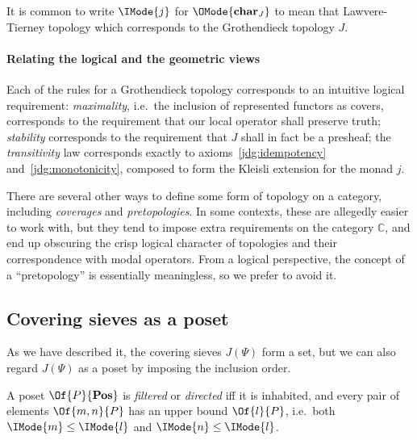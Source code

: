 \documentclass{article}
\newcommand\Char[1]{\mathbf{char}_{#1}}
\newcommand\Posets{\mathbf{Pos}}
\begin{document}
\begin{notation}
  It is common to write $\IMode{j}$ for $\OMode{\Char{J}}$ to mean
  that Lawvere-Tierney topology which corresponds to the Grothendieck
  topology $J$.
\end{notation}

\paragraph{Relating the logical and the geometric views}

Each of the rules for a Grothendieck topology corresponds to an
intuitive logical requirement: \emph{maximality}, i.e.\ the inclusion
of represented functors as covers, corresponds to the requirement that
our local operator shall preserve truth; \emph{stability} corresponds
to the requirement that $J$ shall in fact be a presheaf; the
\emph{transitivity} law corresponds exactly to
axioms~\ref{jdg:idempotency} and~\ref{jdg:monotonicity}, composed to
form the Kleisli extension for the monad $j$.

\begin{remark}
  There are several other ways to define some form of topology on a
  category, including \emph{coverages} and \emph{pretopologies}. In
  some contexts, these are allegedly easier to work with, but they
  tend to impose extra requirements on the category $\mathbb{C}$, and
  end up obscuring the crisp logical character of topologies and their
  correspondence with modal operators. From a logical perspective, the
  concept of a ``pretopology'' is essentially meaningless, so we
  prefer to avoid it.
\end{remark}

\subsection{Covering sieves as a poset}
\newcommand\IsLEQ[2]{\IMode{#1}\leq\IMode{#2}}

As we have described it, the covering sieves $J(\Psi)$ form a set, but
we can also regard $J(\Psi)$ as a poset by imposing the inclusion
order.

\begin{definition}
  A poset $\Of{P}{\Posets}$ is \emph{filtered} or \emph{directed} iff
  it is inhabited, and every pair of elements $\Of{m,n}{P}$ has an
  upper bound $\Of{l}{P}$, i.e.\ both $\IsLEQ{m}{l}$ and
  $\IsLEQ{n}{l}$.
\end{definition}
\end{document}
